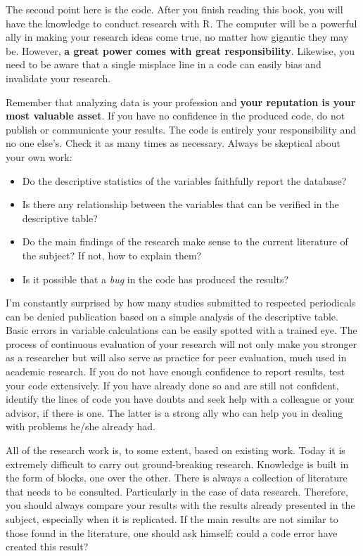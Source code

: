 \documentclass[
  12pt,
]{book}
\providecommand{\tightlist}{%
  \setlength{\itemsep}{0pt}\setlength{\parskip}{0pt}}
\begin{document}
The second point here is the code. After you finish reading this book, you will have the knowledge to conduct research with R. The computer will be a powerful ally in making your research ideas come true, no matter how gigantic they may be. However, \textbf{a great power comes with great responsibility}. Likewise, you need to be aware that a single misplace line in a code can easily bias and invalidate your research.

Remember that analyzing data is your profession and \textbf{your reputation is your most valuable asset}. If you have no confidence in the produced code, do not publish or communicate your results. The code is entirely your responsibility and no one else's. Check it as many times as necessary. Always be skeptical about your own work:

\begin{itemize}
\tightlist
\item
  Do the descriptive statistics of the variables faithfully report the database?
\item
  Is there any relationship between the variables that can be verified in the descriptive table?
\item
  Do the main findings of the research make sense to the current literature of the subject? If not, how to explain them?
\item
  Is it possible that a \emph{bug} in the code has produced the results?
\end{itemize}

I'm constantly surprised by how many studies submitted to respected periodicals can be denied publication based on a simple analysis of the descriptive table. Basic errors in variable calculations can be easily spotted with a trained eye. The process of continuous evaluation of your research will not only make you stronger as a researcher but will also serve as practice for peer evaluation, much used in academic research. If you do not have enough confidence to report results, test your code extensively. If you have already done so and are still not confident, identify the lines of code you have doubts and seek help with a colleague or your advisor, if there is one. The latter is a strong ally who can help you in dealing with problems he/she already had.

All of the research work is, to some extent, based on existing work. Today it is extremely difficult to carry out ground-breaking research. Knowledge is built in the form of blocks, one over the other. There is always a collection of literature that needs to be consulted. Particularly in the case of data research. Therefore, you should always compare your results with the results already presented in the subject, especially when it is replicated. If the main results are not similar to those found in the literature, one should ask himself: could a code error have created this result?
\end{document}
